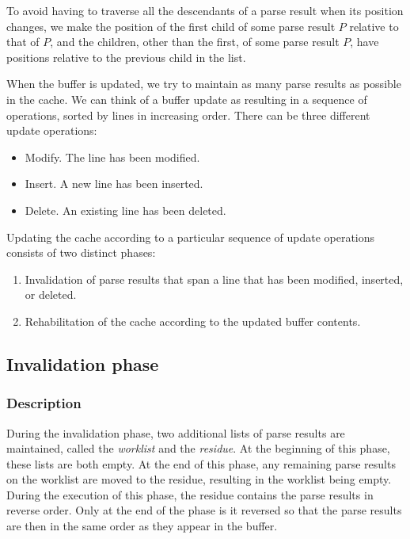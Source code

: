 To avoid having to traverse all the descendants of a parse result when
its position changes, we make the position of the first child of some
parse result $P$ relative to that of $P$, and the children, other than
the first, of some parse result $P$, have positions relative to the
previous child in the list.

When the buffer is updated, we try to maintain as many parse results
as possible in the cache.  We can think of a buffer update as
resulting in a sequence of operations, sorted by lines in increasing
order.  There can be three different update operations:

\begin{itemize}
\item Modify.  The line has been modified.
\item Insert.  A new line has been inserted.
\item Delete.  An existing line has been deleted.
\end{itemize}

Updating the cache according to a particular sequence of update
operations consists of two distinct phases:

\begin{enumerate}
\item Invalidation of parse results that span a line that has been
  modified, inserted, or deleted.
\item Rehabilitation of the cache according to the updated buffer
  contents.
\end{enumerate}

\subsection{Invalidation phase}

\subsubsection{Description}

During the invalidation phase, two additional lists of parse results
are maintained, called the \emph{worklist} and the \emph{residue}.  At
the beginning of this phase, these lists are both empty.  At the end
of this phase, any remaining parse results on the worklist are moved
to the residue, resulting in the worklist being empty.  During the
execution of this phase, the residue contains the parse results in
reverse order.  Only at the end of the phase is it reversed so that
the parse results are then in the same order as they appear in the
buffer.

